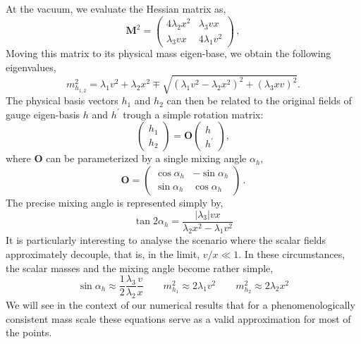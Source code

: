 %
At the vacuum, we evaluate the Hessian matrix as,
%
\begin{equation}
\mathbf{M}^2 =
\begin{pmatrix}
4 \lambda_2 x^2 & \lambda_3 v x \\ 
\lambda_3 v x   & 4 \lambda_1 v^2 
\end{pmatrix}\,,
\label{eq:hess}
\end{equation}
% 
Moving this matrix to its physical mass eigen-base, we obtain the following eigenvalues,
%
\begin{equation}
m_{h_{1,2}}^2 = \lambda_1 v^2 + \lambda_2 x^2 \mp \sqrt{(\lambda_1 v^2 - \lambda_2 x^2)^2 + (\lambda_3 x v)^2}.
\label{eq:eigvals}
\end{equation}
The physical basis vectors $h_1$ and $h_2$ can then be related to the original fields of gauge eigen-basis $h$ and $h^\prime$ trough a simple rotation matrix:
%
\begin{equation}
	\begin{pmatrix}
	h_1 \\
	h_2 
	\end{pmatrix}
	=
	\mathbf{O}
	\begin{pmatrix}
	h \\
	h^\prime 
	\end{pmatrix},
	\label{eq:trans}
\end{equation}
%
where $\mathbf{O}$ can be parameterized by a single mixing angle $\alpha_h$,
%
\begin{equation}
	\mathbf{O} = 
	\begin{pmatrix}
	\cos \alpha_h & -\sin \alpha_h \\
	\sin \alpha_h & \cos \alpha_h 
	\end{pmatrix}\,.
	\label{eq:rotmat}
\end{equation}
%
The precise mixing angle is represented simply by, 
\begin{equation}
\tan 2 \alpha_h   = \frac{ \left| \lambda_3 \right|  v x }{  \lambda_2 x^2 -\lambda_1 v^2 } 
\end{equation} 
%
It is particularly interesting to analyse the scenario where the scalar fields approximately decouple, that is, in the limit, $v/x\ll 1$. In these circumstances, the scalar masses and the mixing angle become rather simple,
\begin{equation}
\sin \alpha_h \approx \dfrac{1}{2}\dfrac{\lambda_3}{\lambda_2} \dfrac{v}{x} \qquad
m_{h_1}^2 \approx 2 \lambda_1 v^2 \qquad m_{h_2}^2 \approx 2 \lambda_2 x^2
\label{eq:simplify}
\end{equation}
%
We will see in the context of our numerical results that for a phenomenologically consistent mass scale these equations serve as a valid approximation for most of the  points. 

